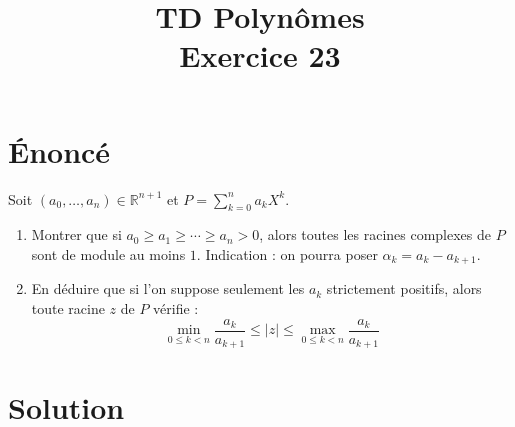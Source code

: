 \documentclass[french]{article}
\title{TD Polynômes \\ Exercice 23}
\date{}
\newcommand{\R}{\mathbb{R}}
\begin{document}
\maketitle

\section{Énoncé}
Soit $(a_0,\ldots,a_n)\in\R^{n+1}$ et $P=\displaystyle\sum_{k=0}^{n}a_kX^k$.
\begin{enumerate}
	\item Montrer que si $a_0\geqslant a_1\geqslant\cdots\geqslant a_n>0$, alors toutes les racines complexes de $P$ sont de module au moins $1$. Indication : on pourra poser $\alpha_k=a_k-a_{k+1}$.
	\item En déduire que si l'on suppose seulement les $a_k$ strictement positifs, alors toute racine $z$ de $P$ vérifie : $$\min_{0\leqslant k<n}\frac{a_k}{a_{k+1}}\leqslant \lvert z\rvert\leqslant\max_{0\leqslant k<n}\frac{a_k}{a_{k+1}}$$
\end{enumerate}
\section{Solution}
\end{document}
